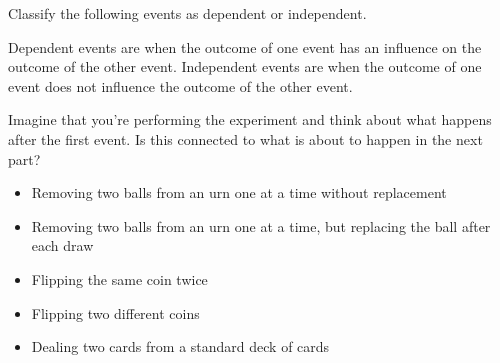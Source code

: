 \documentclass{ximera}
\begin{document}
\begin{question}
Classify the following events as dependent or independent.
    \begin{hint}
    Dependent events are when the outcome of one event has an influence on the outcome of the other event. Independent events are when the outcome of one event does not influence the outcome of the other event.
    \end{hint}
    \begin{hint}
    Imagine that you're performing the experiment and think about what happens after the first event. Is this connected to what is about to happen in the next part?
    \end{hint}

\begin{itemize}
\item Removing two balls from an urn one at a time without replacement
\end{itemize}
\begin{multipleChoice}
\end{multipleChoice}

\begin{itemize}
\item Removing two balls from an urn one at a time, but replacing the ball after each draw
\end{itemize}
\begin{multipleChoice}
\end{multipleChoice}

\begin{itemize}
\item Flipping the same coin twice
\end{itemize}
\begin{multipleChoice}
\end{multipleChoice}

\begin{itemize}
\item Flipping two different coins
\end{itemize}
\begin{multipleChoice}
\end{multipleChoice}

\begin{itemize}
\item Dealing two cards from a standard deck of cards
\end{itemize}
\begin{multipleChoice}
\end{multipleChoice}


\end{question}
\end{document}
